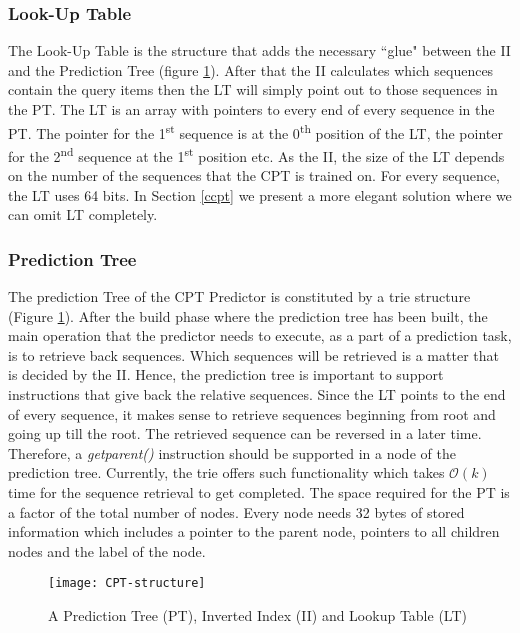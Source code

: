 \subsubsection*{Look-Up Table}
The Look-Up Table is the structure that adds the necessary ``glue" between the II and the Prediction Tree (figure \ref{fig:CPT-structure}). After that the II calculates which sequences contain the query items then the LT will simply point out to those sequences in the PT. The LT is an array with pointers to every end of every sequence in the PT. The pointer for the 1\textsuperscript{st} sequence is at the 0\textsuperscript{th} position of the LT, the pointer for the 2\textsuperscript{nd} sequence at the 1\textsuperscript{st} position etc. As the II, the size of the LT depends on the number of the sequences that the CPT is trained on. For every sequence, the LT uses 64 bits. In Section \ref{ccpt} we present a more elegant solution where we can omit LT completely.

\subsubsection*{Prediction Tree}
The prediction Tree of the CPT Predictor is constituted by a trie structure (Figure \ref{fig:CPT-structure}). After the build phase where the prediction tree has been built, the main operation that the predictor needs to execute, as a part of a prediction task, is to retrieve back sequences. Which sequences will be retrieved is a matter that is decided by the II. Hence, the prediction tree is important to support instructions that give back the relative sequences. Since the LT points to the end of every sequence, it makes sense to retrieve sequences beginning from root and going up till the root. The retrieved sequence can be reversed in a later time. Therefore, a \emph{getparent()} instruction should be supported in a node of the prediction tree. Currently, the trie offers such functionality which takes \(\mathcal{O}(k)\) time for the sequence retrieval to get completed. The space required for the PT is a factor of the total number of nodes. Every node needs 32 bytes of stored information which includes a pointer to the parent node, pointers to all children nodes and the label of the node.

\begin{figure}[h]
    \centering
    \texttt{[image: CPT-structure]}
    \caption{A Prediction Tree (PT), Inverted Index (II) and Lookup Table (LT)}
    \label{fig:CPT-structure}
\end{figure}

